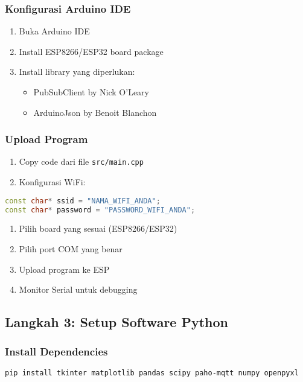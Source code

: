 \documentclass[12pt,a4paper]{article}
\begin{document}
\subsubsection{Konfigurasi Arduino IDE}
\begin{enumerate}
    \item Buka Arduino IDE
    \item Install ESP8266/ESP32 board package
    \item Install library yang diperlukan:
    \begin{itemize}
        \item PubSubClient by Nick O'Leary
        \item ArduinoJson by Benoit Blanchon
    \end{itemize}
\end{enumerate}

\subsubsection{Upload Program}
\begin{enumerate}
    \item Copy code dari file \texttt{src/main.cpp}
    \item Konfigurasi WiFi:
\end{enumerate}

\begin{lstlisting}[language=C++, caption=Konfigurasi WiFi]
const char* ssid = "NAMA_WIFI_ANDA";
const char* password = "PASSWORD_WIFI_ANDA";
\end{lstlisting}

\begin{enumerate}[resume]
    \item Pilih board yang sesuai (ESP8266/ESP32)
    \item Pilih port COM yang benar
    \item Upload program ke ESP
    \item Monitor Serial untuk debugging
\end{enumerate}

\subsection{Langkah 3: Setup Software Python}

\subsubsection{Install Dependencies}
\begin{lstlisting}[language=bash, caption=Install Python Libraries]
pip install tkinter matplotlib pandas scipy paho-mqtt numpy openpyxl
\end{lstlisting}
\end{document}
